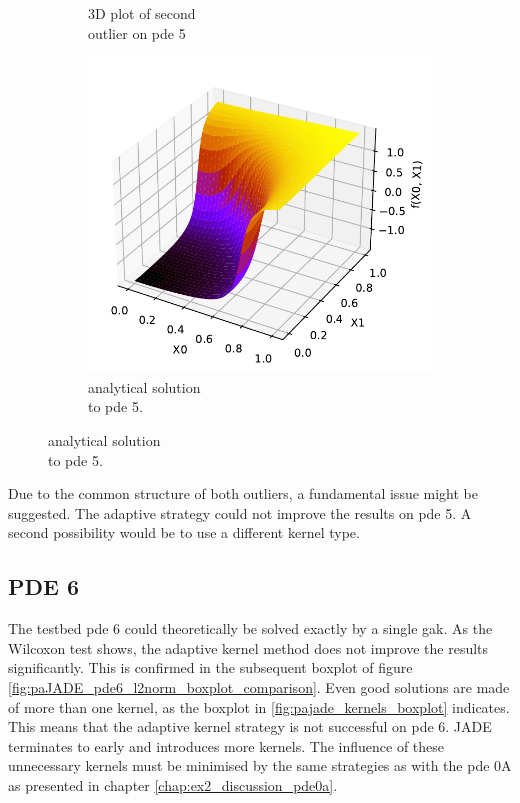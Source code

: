 \documentclass[./\jobname.tex]{subfiles}
\begin{document}
\begin{figure}[H]
\begin{subfigure}[b]{0.3333\linewidth}
		\caption{3D plot of second \\outlier on \gls{pde} 5}
		\label{fig:paJADE_pde5_outlier1}
	\end{subfigure}%
	\begin{subfigure}[b]{0.3333\linewidth}
		\centering
		\includegraphics[width=1\textwidth]{../../code/testbed/pde5/sol_pde_5.pdf}
		\caption{analytical solution \\to \gls{pde} 5.}
		\label{fig:pde5_analytical_solution_2}
	\end{subfigure}%
	\label{fig:paJADE_pde5_3D_plot_outlier}
\end{figure}

Due to the common structure of both outliers, a fundamental issue might be suggested. The adaptive strategy could not improve the results on \gls{pde} 5. A second possibility would be to use a different kernel type. 


\subsection{PDE 6}

The testbed \gls{pde} 6 could theoretically be solved exactly by a single \gls{gak}. As the Wilcoxon test shows, the adaptive kernel method does not improve the results significantly. This is confirmed in the subsequent boxplot of figure \ref{fig:paJADE_pde6_l2norm_boxplot_comparison}. Even good solutions are made of more than one kernel, as the boxplot in \ref{fig:pajade_kernels_boxplot} indicates. This means that the adaptive kernel strategy is not successful on \gls{pde} 6. JADE terminates to early and introduces more kernels. The influence of these unnecessary kernels must be minimised by the same strategies as with the \gls{pde} 0A as presented in chapter \ref{chap:ex2_discussion_pde0a}.
\end{document}
